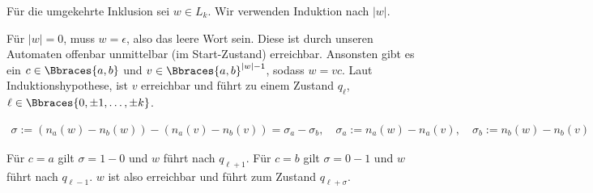 \begin{solution}
Für die umgekehrte Inklusion sei $w \in L_k$.
Wir verwenden Induktion nach $|w|$.

Für $|w| = 0$, muss $w = \epsilon$, also das leere Wort sein.
Diese ist durch unseren Automaten offenbar unmittelbar (im Start-Zustand) erreichbar.
Ansonsten gibt es ein $c \in \Bbraces{a, b}$ und $v \in \Bbraces{a, b}^{|w| - 1}$, sodass $w = v c$.
Laut Induktionshypothese, ist $v$ erreichbar und führt zu einem Zustand $q_\ell$, $\ell \in \Bbraces{0, \pm 1, \dots, \pm k}$.

\begin{align*}
    \sigma := (n_a(w) - n_b(w)) - (n_a(v) - n_b(v)) = \sigma_a - \sigma_b,
    \quad
    \sigma_a := n_a(w) - n_a(v),
    \quad
    \sigma_b := n_b(w) - n_b(v)
\end{align*}

Für $c = a$ gilt $\sigma = 1 - 0$ und $w$ führt nach $q_{\ell + 1}$.
Für $c = b$ gilt $\sigma = 0 - 1$ und $w$ führt nach $q_{\ell - 1}$.
$w$ ist also erreichbar und führt zum Zustand $q_{\ell + \sigma}$.

\end{solution}

